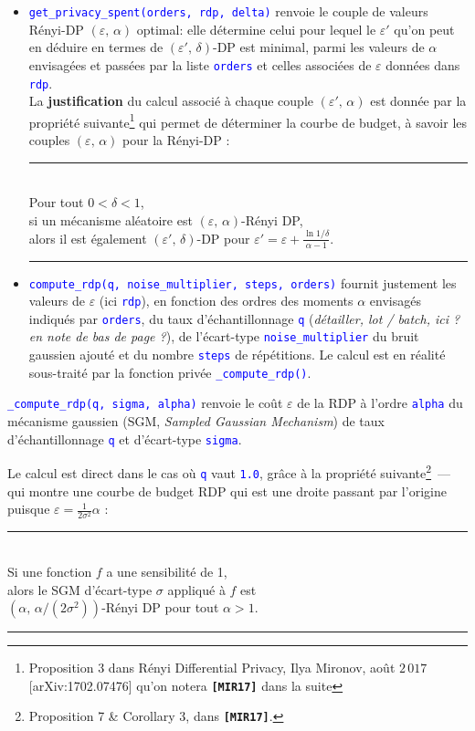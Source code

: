 \documentclass[a4paper,11pt]{article} %
\newcommand{\ttt}[1]{\texttt{#1}}
\newcommand{\code}[1]{\textcolor{blue}{\texttt{#1}}}
\newcommand{\prop}[1]{\begin{center}\rule{0.95\linewidth}{0.5pt}\\\textsf{#1}\\\rule{0.95\linewidth}{0.5pt}\end{center}}
\begin{document}
\begin{itemize}
    \item 
    \code{get\_privacy\_spent(orders, rdp, delta)} renvoie le couple de valeurs Rényi-DP $(\varepsilon,\,\alpha)$ optimal: elle détermine celui pour lequel le $\varepsilon'$ qu'on peut en déduire en termes de $(\varepsilon',\,\delta)$-DP est minimal, parmi les valeurs de $\alpha$ envisagées et passées par la liste \code{orders} et celles associées de $\varepsilon$ données dans \code{rdp}.\\
    La \textbf{justification} du calcul associé à chaque couple $(\varepsilon',\,\alpha)$ est donnée par la propriété suivante\footnote{\textsf{Proposition 3} dans \og Rényi Differential Privacy\fg{}, Ilya Mironov, août $2\,017$ [arXiv:1702.07476] qu'on notera \textbf{\ttt{[MIR17]}} dans la suite} qui permet de déterminer la \og courbe de budget\fg{}, à savoir les couples $(\varepsilon,\,\alpha)$ pour la Rényi-DP :
    \prop{Pour tout $0<\delta<1$,\\
        si un mécanisme aléatoire est $(\varepsilon,\,\alpha)$-Rényi DP,\\
        alors il est également $(\varepsilon',\, \delta)$-DP pour $\varepsilon'=\varepsilon+\frac{\ln 1/\delta}{\alpha-1}$.}
    \item 
    \code{compute\_rdp(q, noise\_multiplier, steps, orders)} fournit justement les valeurs de $\varepsilon$ (ici \code{rdp}), en fonction des ordres des moments $\alpha$ envisagés indiqués par \code{orders}, du taux d'échantillonnage \code{q} (\emph{détailler, lot / batch, ici ? en note de bas de page ?}), de l'écart-type \code{noise\_multiplier} du bruit gaussien ajouté et du nombre \code{steps} de répétitions. Le calcul est en réalité sous-traité par la fonction \og privée\fg{} \code{\_compute\_rdp()}.
\end{itemize}
\code{\_compute\_rdp(q, sigma, alpha)} renvoie le coût $\varepsilon$ de la RDP à l'ordre \code{alpha} du mécanisme gaussien (SGM, \emph{Sampled Gaussian Mechanism}) de taux d'échantillonnage \code{q} et d'écart-type \code{sigma}.

Le calcul est direct dans le cas où \code{q} vaut \code{1.0}, grâce à la propriété suivante\footnote{\textsf{Proposition 7} \& \textsf{Corollary 3}, dans \textbf{\ttt{[MIR17]}}.}~--- qui montre une \og courbe de budget RDP\fg{} qui est une droite passant par l'origine puisque $\varepsilon = \frac{1}{2\sigma^2}\alpha$ :
\prop{Si une fonction $f$ a une sensibilité de 1,\\
      alors le SGM d'écart-type $\sigma$ appliqué à $f$ est\\
      $(\alpha,\, \alpha/(2\sigma^2))$-Rényi DP pour tout $\alpha>1$.}
\end{document}
